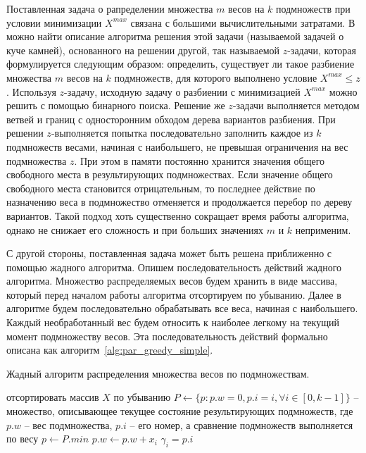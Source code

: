 Поставленная задача о рапределении множества $m$ весов на $k$ подмножеств при условии минимизации $X^{max}$ связана с большими вычислительными затратами.
В \cite{Romanovskii1977Extreme} можно найти описание алгоритма решения этой задачи (называемой задачей о куче камней), основанного на решении другой, так называемой $z$-задачи, которая формулируется следующим образом: определить, существует ли такое разбиение множества $m$ весов на $k$ подмножеств, для которого выполнено условие $X^{max} \le z$.
Используя $z$-задачу, исходную задачу о разбиении с минимизацией $X^{max}$ можно решить с помощью бинарного поиска.
Решение же $z$-задачи выполняется методом ветвей и границ с односторонним обходом дерева вариантов разбиения.
При решении $z$-выполняется попытка последовательно заполнить каждое из $k$ подмножеств весами, начиная с наибольшего, не превышая ограничения на вес подмножества $z$.
При этом в памяти постоянно хранится значения общего свободного места в результирующих подмножествах.
Если значение общего свободного места становится отрицательным, то последнее действие по назначению веса в подмножество отменяется и продолжается перебор по дереву вариантов.
Такой подход хоть существенно сокращает время работы алгоритма, однако не снижает его сложность и при больших значениях $m$ и $k$ неприменим.

С другой стороны, поставленная задача может быть решена приближенно с помощью жадного алгоритма.
Опишем последовательность действий жадного алгоритма.
Множество распределяемых весов будем хранить в виде массива, который перед началом работы алгоритма отсортируем по убыванию.
Далее в алгоритме будем последовательно обрабатывать все веса, начиная с наибольшего.
Каждый необработанный вес будем относить к наиболее легкому на текущий момент подмножеству весов.
Эта последовательность действий формально описана как алгоритм~\ref{alg:par_greedy_simple}.

\begin{algo}\label{alg:par_greedy_simple}
Жадный алгоритм распределения множества весов по подмножествам.
\begin{algorithm}
\DontPrintSemicolon
{}
отсортировать массив $X$ по убыванию\;
$P \leftarrow \{ p : p.w = 0, p.i = i, \forall i \in [0, k - 1] \}$ -- множество, описывающее текущее состояние результирующих подмножеств, где $p.w$ -- вес подмножества, $p.i$ -- его номер, а сравнение подмножеств выполняется по весу\;
{
	$p \leftarrow P.min$\;
	$p.w \leftarrow p.w + x_i$\;	
	$\gamma_i = p.i$\;
}
\end{algorithm}
\end{algo}


